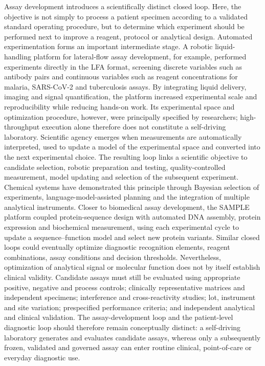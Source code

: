 \documentclass[12pt,a4paper]{article}
\begin{document}
Assay development introduces a scientifically distinct closed loop. Here, the objective is not simply to process a patient specimen according to a validated standard operating procedure, but to determine which experiment should be performed next to improve a reagent, protocol or analytical design. Automated experimentation forms an important intermediate stage. A robotic liquid-handling platform for lateral-flow assay development, for example, performed experiments directly in the LFA format, screening discrete variables such as antibody pairs and continuous variables such as reagent concentrations for malaria, SARS-CoV-2 and tuberculosis assays. By integrating liquid delivery, imaging and signal quantification, the platform increased experimental scale and reproducibility while reducing hands-on work. Its experimental space and optimization procedure, however, were principally specified by researchers; high-throughput execution alone therefore does not constitute a self-driving laboratory. Scientific agency emerges when measurements are automatically interpreted, used to update a model of the experimental space and converted into the next experimental choice. The resulting loop links a scientific objective to candidate selection, robotic preparation and testing, quality-controlled measurement, model updating and selection of the subsequent experiment. Chemical systems have demonstrated this principle through Bayesian selection of experiments, language-model-assisted planning and the integration of multiple analytical instruments. Closer to biomedical assay development, the SAMPLE platform coupled protein-sequence design with automated DNA assembly, protein expression and biochemical measurement, using each experimental cycle to update a sequence--function model and select new protein variants. Similar closed loops could eventually optimize diagnostic recognition elements, reagent combinations, assay conditions and decision thresholds. Nevertheless, optimization of analytical signal or molecular function does not by itself establish clinical validity. Candidate assays must still be evaluated using appropriate positive, negative and process controls; clinically representative matrices and independent specimens; interference and cross-reactivity studies; lot, instrument and site variation; prespecified performance criteria; and independent analytical and clinical validation. The assay-development loop and the patient-level diagnostic loop should therefore remain conceptually distinct: a self-driving laboratory generates and evaluates candidate assays, whereas only a subsequently frozen, validated and governed assay can enter routine clinical, point-of-care or everyday diagnostic use.
\end{document}
